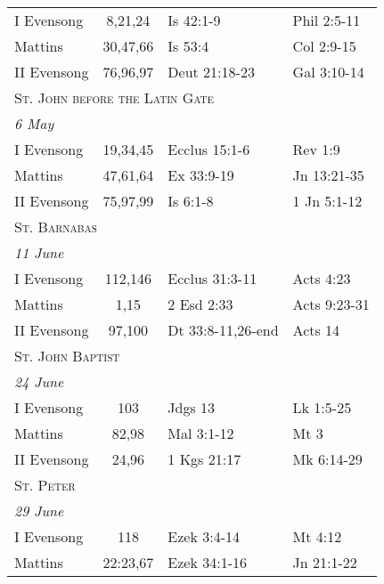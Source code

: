 \begin{longtable}{l c l l}
\hspace{1em} I Evensong&8,21,24&Is 42:1-9&Phil 2:5-11\\
\hspace{1em} Mattins&30,47,66&Is 53:4&Col 2:9-15\\
\hspace{1em} II Evensong&76,96,97&Deut 21:18-23&Gal 3:10-14\\
%
\multicolumn{4}{l}{\textsc{St. John before the Latin Gate}}\\
\multicolumn{4}{l}{\textit{6 May}}\\
\hspace{1em} I Evensong&19,34,45&Ecclus 15:1-6&Rev 1:9\\
\hspace{1em} Mattins&47,61,64&Ex 33:9-19&Jn 13:21-35\\
\hspace{1em} II Evensong&75,97,99&Is 6:1-8&1 Jn 5:1-12\\
%
\multicolumn{4}{l}{\textsc{St. Barnabas}}\\
\multicolumn{4}{l}{\textit{11 June}}\\
\hspace{1em} I Evensong&112,146&Ecclus 31:3-11&Acts 4:23\\
\hspace{1em} Mattins&1,15&2 Esd 2:33&Acts 9:23-31\\
\hspace{1em} II Evensong&97,100&Dt 33:8-11,26-end&Acts 14\\
\multicolumn{4}{l}{\textsc{St. John Baptist}}\\
\multicolumn{4}{l}{\textit{24 June}}\\
\hspace{1em} I Evensong&103&Jdgs 13&Lk 1:5-25\\
\hspace{1em} Mattins&82,98&Mal 3:1-12&Mt 3\\
\hspace{1em} II Evensong&24,96&1 Kgs 21:17&Mk 6:14-29\\
\multicolumn{4}{l}{\textsc{St. Peter}}\\
\multicolumn{4}{l}{\textit{29 June}}\\
\hspace{1em} I Evensong&118&Ezek 3:4-14&Mt 4:12\\
\hspace{1em} Mattins&22:23,67&Ezek 34:1-16&Jn 21:1-22\\

\end{longtable}
